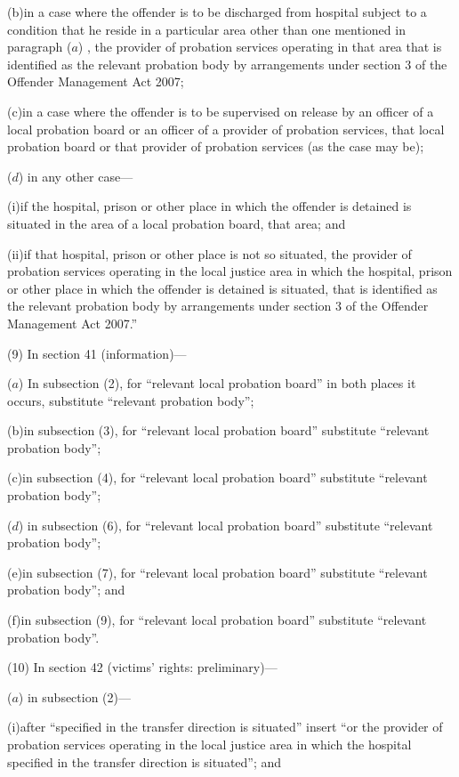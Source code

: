 \documentclass[12pt,a4paper]{article}
\begin{document}
(b)in a case where the offender is to be discharged from hospital subject to a condition that he reside in a particular area other than one mentioned in paragraph ($a$) , the provider of probation services operating in that area that is identified as the relevant probation body by arrangements under section 3 of the Offender Management Act 2007;

(c)in a case where the offender is to be supervised on release by an officer of a local probation board or an officer of a provider of probation services, that local probation board or that provider of probation services (as the case may be);

($d$) in any other case—

(i)if the hospital, prison or other place in which the offender is detained is situated in the area of a local probation board, that area; and

(ii)if that hospital, prison or other place is not so situated, the provider of probation services operating in the local justice area in which the hospital, prison or other place in which the offender is detained is situated, that is identified as the relevant probation body by arrangements under section 3 of the Offender Management Act 2007.”

(9) In section 41 (information)—

($a$) In subsection (2), for “relevant local probation board” in both places it occurs, substitute “relevant probation body”;

(b)in subsection (3), for “relevant local probation board” substitute “relevant probation body”;

(c)in subsection (4), for “relevant local probation board” substitute “relevant probation body”;

($d$) in subsection (6), for “relevant local probation board” substitute “relevant probation body”;

(e)in subsection (7), for “relevant local probation board” substitute “relevant probation body”; and

(f)in subsection (9), for “relevant local probation board” substitute “relevant probation body”.

(10) In section 42 (victims’ rights: preliminary)—

($a$) in subsection (2)—

(i)after “specified in the transfer direction is situated” insert “or the provider of probation services operating in the local justice area in which the hospital specified in the transfer direction is situated”; and
\end{document}

